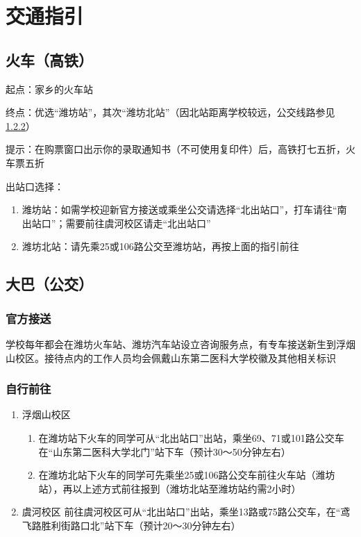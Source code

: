 
\section[交通指引]{交通指引}
\label{goto_school}
\subsection[火车（高铁）]{火车（高铁）}
起点：家乡的火车站

终点：优选“潍坊站”，其次“潍坊北站”（因北站距离学校较远，公交线路参见\uline{\ref{bus}}）

提示：在购票窗口出示你的录取通知书（不可使用复印件）后，高铁打七五折，火车票五折

出站口选择：
\begin{enumerate}
    \item 潍坊站：如需学校迎新官方接送或乘坐公交请选择“北出站口”，打车请往“南出站口”；需要前往虞河校区请走“北出站口”
    \item 潍坊北站：请先乘25或106路公交至潍坊站，再按上面的指引前往
\end{enumerate}

\subsection[大巴（公交）]{大巴（公交）}

\subsubsection[官方接送]{官方接送}
学校每年都会在潍坊火车站、潍坊汽车站设立咨询服务点，有专车接送新生到浮烟山校区。接待点内的工作人员均会佩戴山东第二医科大学校徽及其他相关标识

\subsubsection[自行前往]{自行前往}
\label{bus}
\begin{enumerate}
    \item 浮烟山校区
          \begin{enumerate}
              \item 在潍坊站下火车的同学可从“北出站口”出站，乘坐69、71或101路公交车在“山东第二医科大学北门”站下车（预计30～50分钟左右）
              \item 在潍坊北站下火车的同学可先乘坐25或106路公交车前往火车站（潍坊站），再以上述方式前往报到（潍坊北站至潍坊站约需2小时）
          \end{enumerate}
    \item 虞河校区
          前往虞河校区可从“北出站口”出站，乘坐13路或75路公交车，在“鸢飞路胜利街路口北”站下车（预计20～30分钟左右）
\end{enumerate}

